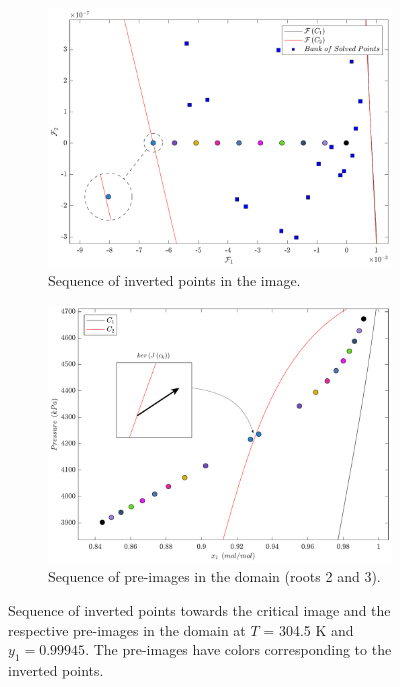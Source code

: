 \documentclass[journal=iecred,manuscript=article]{achemso}
\theoremstyle{definition}
\theoremstyle{remark}
\begin{document}
\begin{figure}
\centering
\begin{subfigure}{.48\textwidth}
  \centering
  \includegraphics[width=\linewidth]{imagem3.pdf}
  \caption{Sequence of inverted points in the image.}
  \label{fig:imagem_S}
\end{subfigure}\hfill
\begin{subfigure}{.48\textwidth}
  \centering
  \includegraphics[width=\linewidth]{dominio3.pdf}
  \caption{Sequence of pre-images in the domain (roots 2 and 3).}
  \label{fig:domain_S}
\end{subfigure}
\caption{Sequence of inverted points towards the critical image and the respective pre-images in the domain at $T$ = 304.5 K and $y_1 = 0.99945$. The pre-images have colors corresponding to the inverted points.}
\label{fig:L_path_domain_image}
\end{figure}
\end{document}
